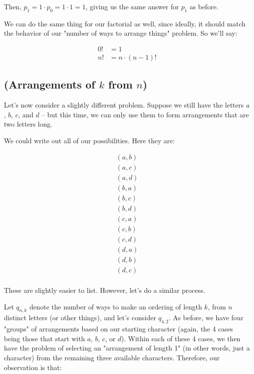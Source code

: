Then, $p_1 = 1 \cdot p_0 = 1 \cdot 1 = 1$, giving us the same answer for $p_1$ as before. 

We can do the same thing for our factorial as well, since ideally, it should match the behavior of our "number of ways to arrange things" problem. So we'll say:

\begin{align}
0! &= 1 \\
n! &= n \cdot (n-1)!
\end{align}


\subsection{(Arrangements of $k$ from $n$)}

Let's now consider a slightly different problem. Suppose we still have the letters $a$, $b$, $c$, and $d$ -- but this time, we can only use them to form arrangements that are two letters long.

We could write out all of our possibilities. Here they are:

\begin{gather*}
(a, b) \\
(a, c) \\
(a, d) \\
(b, a) \\
(b, c) \\
(b, d) \\
(c, a) \\
(c, b) \\
(c, d) \\
(d, a) \\
(d, b) \\
(d, c) \\
\end{gather*}

These are slightly easier to list. However, let's do a similar process.

Let $q_{n,k}$ denote the number of ways to make an ordering of length $k$, from $n$ distinct letters (or other things), and let's consider $q_{4,2}$. As before, we have four "groups" of arrangements based on our starting character (again, the 4 cases being those that start with $a$, $b$, $c$, or $d$). Within each of these 4 cases, we then have the problem of selecting an "arrangement of length 1" (in other words, just a character) from the remaining three available characters. Therefore, our observation is that:

